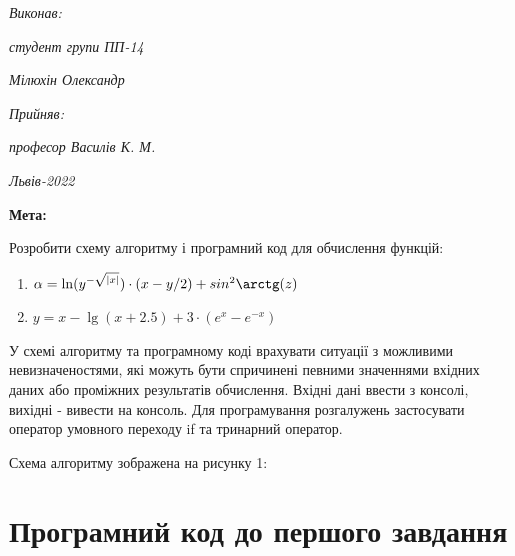 \documentclass{article}
\begin{document}
\vspace{12.1pt} %
	{\fontsize{14}{22.4}\selectfont
\begin{flushright}
	\textit{Виконав:}

	\textit{студент групи ПП-14}

	\textit{Мілюхін Олександр}

	\textit{Прийняв:}

	\textit{професор Василів К. М.}
\end{flushright}
\vspace{37.4pt} %
\begin{center}
\textit{Львів-2022}
\vspace{37.4pt} %
\end{center}
	}
{\fontsize{14}{16.1}\selectfont
\textbf{Мета:}

Розробити схему алгоритму і програмний код для обчислення функцій:

\begin{enumerate}
	\item $\alpha = \ln(y^{-\sqrt{|x|}}) \cdot (x-y/2)+sin^2\arctg(z)$
	\item $y = x - \lg(x+2.5) + 3\cdot(e^x-e^{-x})$
\end{enumerate}

У схемі алгоритму та програмному коді врахувати ситуації з можливими
невизначеностями, які можуть бути спричинені певними значеннями вхідних даних
або проміжних результатів обчислення.
Вхідні дані ввести з консолі, вихідні - вивести на консоль.
Для програмування розгалужень застосувати оператор умовного переходу if та
тринарний оператор.

\bigskip

Схема алгоритму зображена на рисунку 1:

}



\section{Програмний код до першого завдання}
\end{document}
